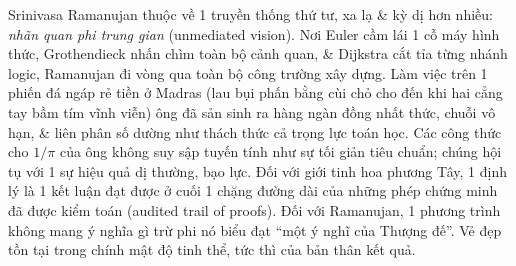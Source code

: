 \documentclass[11pt]{article}
\begin{document}
Srinivasa Ramanujan thuộc về 1 truyền thống thứ tư, xa lạ \& kỳ dị hơn nhiều: \emph{nhãn quan phi trung gian} (unmediated vision). Nơi Euler cầm lái 1 cỗ máy hình thức, Grothendieck nhấn chìm toàn bộ cảnh quan, \& Dijkstra cắt tỉa từng nhánh logic, Ramanujan đi vòng qua toàn bộ công trường xây dựng. Làm việc trên 1 phiến đá ngáp rẻ tiền ở Madras (lau bụi phấn bằng cùi chỏ cho đến khi hai cẳng tay bầm tím vĩnh viễn) ông đã sản sinh ra hàng ngàn đồng nhất thức, chuỗi vô hạn, \& liên phân số dường như thách thức cả trọng lực toán học. Các công thức cho $1/\pi$ của ông không suy sập tuyến tính như sự tối giản tiêu chuẩn; chúng hội tụ với 1 sự hiệu quả dị thường, bạo lực. Đối với giới tinh hoa phương Tây, 1 định lý là 1 kết luận đạt được ở cuối 1 chặng đường dài của những phép chứng minh đã được kiểm toán (audited trail of proofs). Đối với Ramanujan, 1 phương trình không mang ý nghĩa gì trừ phi nó biểu đạt ``một ý nghĩ của Thượng đế''. Vẻ đẹp tồn tại trong chính mật độ tinh thể, tức thì của bản thân kết quả.
\end{document}
